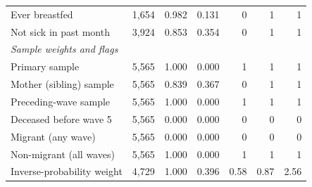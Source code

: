 \begin{longtable}{lrrrrrr}
Ever breastfed & 1,654 & 0.982 & 0.131 & 0 & 1 & 1 \\
Not sick in past month & 3,924 & 0.853 & 0.354 & 0 & 1 & 1 \\
\midrule
\multicolumn{7}{l}{\emph{Sample weights and flags}} \\
Primary sample & 5,565 & 1.000 & 0.000 & 1 & 1 & 1 \\
Mother (sibling) sample & 5,565 & 0.839 & 0.367 & 0 & 1 & 1 \\
Preceding-wave sample & 5,565 & 1.000 & 0.000 & 1 & 1 & 1 \\
Deceased before wave 5 & 5,565 & 0.000 & 0.000 & 0 & 0 & 0 \\
Migrant (any wave) & 5,565 & 0.000 & 0.000 & 0 & 0 & 0 \\
Non-migrant (all waves) & 5,565 & 1.000 & 0.000 & 1 & 1 & 1 \\
Inverse-probability weight & 4,729 & 1.000 & 0.396 & 0.58 & 0.87 & 2.56 \\
\end{longtable}
